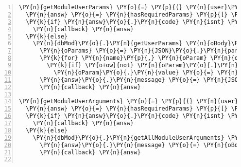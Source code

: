 \begin{Verbatim}[fontsize=\scriptsize,commandchars=\\\{\},numbers=left,firstnumber=1,stepnumber=1]
\PY{n}{getModuleUserParams} \PY{o}{=} \PY{p}{(} \PY{n}{user}\PY{p}{,} \PY{n}{oBody}\PY{p}{,} \PY{n}{dbMod}\PY{p}{,} \PY{n}{callback} \PY{p}{)} \PY{o}{\PYZhy{}}\PY{o}{\PYZgt{}}
  \PY{n}{answ} \PY{o}{=} \PY{n}{hasRequiredParams} \PY{p}{[} \PY{l+s}{\PYZsq{}}\PY{l+s}{id}\PY{l+s}{\PYZsq{}} \PY{p}{]}\PY{p}{,} \PY{n}{oBody}
  \PY{k}{if} \PY{n}{answ}\PY{o}{.}\PY{n}{code} \PY{n}{isnt} \PY{l+m+mi}{200}
    \PY{n}{callback} \PY{n}{answ}
  \PY{k}{else}
    \PY{n}{dbMod}\PY{o}{.}\PY{n}{getUserParams} \PY{n}{oBody}\PY{o}{.}\PY{n}{id}\PY{p}{,} \PY{n}{user}\PY{o}{.}\PY{n}{username}\PY{p}{,} \PY{p}{(} \PY{n}{err}\PY{p}{,} \PY{n+nb}{str} \PY{p}{)} \PY{o}{\PYZhy{}}\PY{o}{\PYZgt{}}
      \PY{n}{oParams} \PY{o}{=} \PY{n}{JSON}\PY{o}{.}\PY{n}{parse} \PY{n+nb}{str}
      \PY{k}{for} \PY{n}{name}\PY{p}{,} \PY{n}{oParam} \PY{n}{of} \PY{n}{oParams}
        \PY{k}{if} \PY{o+ow}{not} \PY{n}{oParam}\PY{o}{.}\PY{n}{shielded}
          \PY{n}{oParam}\PY{o}{.}\PY{n}{value} \PY{o}{=} \PY{n}{encryption}\PY{o}{.}\PY{n}{decrypt} \PY{n}{oParam}\PY{o}{.}\PY{n}{value}
      \PY{n}{answ}\PY{o}{.}\PY{n}{message} \PY{o}{=} \PY{n}{JSON}\PY{o}{.}\PY{n}{stringify} \PY{n}{oParams}
      \PY{n}{callback} \PY{n}{answ}

\PY{n}{getModuleUserArguments} \PY{o}{=} \PY{p}{(} \PY{n}{user}\PY{p}{,} \PY{n}{oBody}\PY{p}{,} \PY{n}{dbMod}\PY{p}{,} \PY{n}{callback} \PY{p}{)} \PY{o}{\PYZhy{}}\PY{o}{\PYZgt{}}
  \PY{n}{answ} \PY{o}{=} \PY{n}{hasRequiredParams} \PY{p}{[} \PY{l+s}{\PYZsq{}}\PY{l+s}{ruleId}\PY{l+s}{\PYZsq{}} \PY{p}{,}\PY{l+s}{\PYZsq{}}\PY{l+s}{moduleId}\PY{l+s}{\PYZsq{}} \PY{p}{]}\PY{p}{,} \PY{n}{oBody}
  \PY{k}{if} \PY{n}{answ}\PY{o}{.}\PY{n}{code} \PY{n}{isnt} \PY{l+m+mi}{200}
    \PY{n}{callback} \PY{n}{answ}
  \PY{k}{else}
    \PY{n}{dbMod}\PY{o}{.}\PY{n}{getAllModuleUserArguments} \PY{n}{user}\PY{o}{.}\PY{n}{username}\PY{p}{,} \PY{n}{oBody}\PY{o}{.}\PY{n}{ruleId}\PY{p}{,} \PY{n}{oBody}\PY{o}{.}\PY{n}{moduleId}\PY{p}{,} \PY{p}{(} \PY{n}{err}\PY{p}{,} \PY{n}{oBody} \PY{p}{)} \PY{o}{\PYZhy{}}\PY{o}{\PYZgt{}}
      \PY{n}{answ}\PY{o}{.}\PY{n}{message} \PY{o}{=} \PY{n}{oBody}
      \PY{n}{callback} \PY{n}{answ}


\end{Verbatim}
